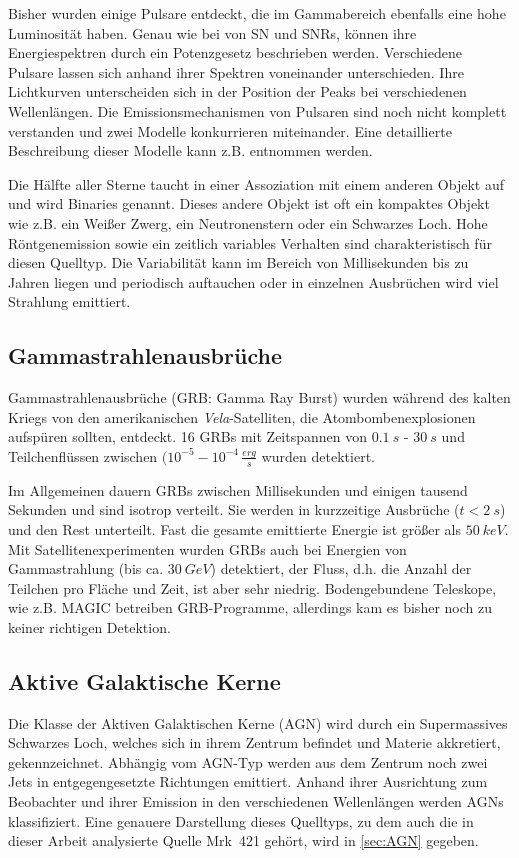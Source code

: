Bisher wurden einige Pulsare entdeckt, die im Gammabereich ebenfalls eine hohe Luminosität haben.
Genau wie bei von SN und SNRs, können ihre Energiespektren durch ein Potenzgesetz beschrieben werden.
Verschiedene Pulsare lassen sich anhand ihrer Spektren voneinander unterschieden.
Ihre Lichtkurven unterscheiden sich in der Position der Peaks bei verschiedenen Wellenlängen.
Die Emissionsmechanismen von Pulsaren sind noch nicht komplett verstanden und zwei Modelle konkurrieren miteinander.
Eine detaillierte Beschreibung dieser Modelle kann z.B. \cite{Weekes} entnommen werden.

Die Hälfte aller Sterne taucht in einer Assoziation mit einem anderen Objekt auf und wird Binaries genannt.
Dieses andere Objekt ist oft ein kompaktes Objekt wie z.B. ein Weißer Zwerg, ein Neutronenstern oder ein Schwarzes Loch.
Hohe Röntgenemission sowie ein zeitlich variables Verhalten sind charakteristisch für diesen Quelltyp.
Die Variabilität kann im Bereich von Millisekunden bis zu Jahren liegen und periodisch auftauchen oder in einzelnen Ausbrüchen wird viel Strahlung emittiert.\cite{Weekes}


\subsection{Gammastrahlenausbrüche}
Gammastrahlenausbrüche (GRB: Gamma Ray Burst) wurden während des kalten Kriegs von den amerikanischen \textit{Vela}-Satelliten, die Atombombenexplosionen aufspüren sollten, entdeckt.
16 GRBs mit Zeitspannen von $\SI{0,1}{s}$ - $\SI{30}{s}$ und Teilchenflüssen zwischen $(10^{-5}-10^{-4}\,\frac{\si{erg}}{\si{s}}$ wurden detektiert.

Im Allgemeinen dauern GRBs zwischen Millisekunden und einigen tausend Sekunden und sind isotrop verteilt.
Sie werden in kurzzeitige Ausbrüche ($t<\SI{2}{s}$) und den Rest unterteilt.
Fast die gesamte emittierte Energie ist größer als $\SI{50}{keV}$.
Mit Satellitenexperimenten wurden GRBs auch bei Energien von Gammastrahlung (bis ca. $\SI{30}{GeV}$) detektiert, der Fluss, d.h. die Anzahl der Teilchen pro Fläche und Zeit, ist aber sehr niedrig.
Bodengebundene Teleskope, wie z.B. MAGIC betreiben GRB-Programme, allerdings kam es bisher noch zu keiner richtigen Detektion.\cite{Weekes}


\subsection{Aktive Galaktische Kerne}
Die Klasse der Aktiven Galaktischen Kerne (AGN) wird durch ein Supermassives Schwarzes Loch, welches sich in ihrem Zentrum befindet und Materie akkretiert, gekennzeichnet.
Abhängig vom AGN-Typ werden aus dem Zentrum noch zwei Jets in entgegengesetzte Richtungen emittiert.  
Anhand ihrer Ausrichtung zum Beobachter und ihrer Emission in den verschiedenen Wellenlängen werden AGNs klassifiziert. 
Eine genauere Darstellung dieses Quelltyps, zu dem auch die in dieser Arbeit analysierte Quelle Mrk~421 gehört, wird in \autoref{sec:AGN} gegeben.

